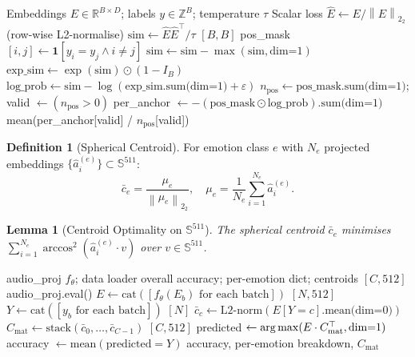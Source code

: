 \documentclass[12pt,a4paper]{article}
\theoremstyle{definition}
\newtheorem{definition}{Definition}[section]
\theoremstyle{plain}
\newtheorem{lemma}[theorem]{Lemma}
\theoremstyle{remark}
\newcommand{\R}{\mathbb{R}}
\newcommand{\Sph}{\mathbb{S}}
\newcommand{\Norm}[1]{\left\|#1\right\|_2}
\newcommand{\argmax}{\operatornamewithlimits{arg\,max}}
\begin{document}
\begin{algorithm}[H]
\caption{SupCon Loss Computation}
\label{alg:supcon}
\begin{algorithmic}[1]
\Require Embeddings $E \in \R^{B \times D}$; labels $y \in \mathbb{Z}^B$; temperature $\tau$
\Ensure Scalar loss
\State $\hat{E} \gets E / \Norm{E}_2$ (row-wise L2-normalise)
\State $\text{sim} \gets \hat{E}\hat{E}^\top / \tau$ \quad $[B,B]$
\State pos\_mask$[i,j] \gets \mathbf{1}[y_i = y_j \wedge i \ne j]$
\State $\text{sim} \gets \text{sim} - \max(\text{sim}, \text{dim=1})$ 
\State $\text{exp\_sim} \gets \exp(\text{sim}) \odot (1 - I_B)$ 
\State $\text{log\_prob} \gets \text{sim} - \log(\text{exp\_sim.sum(dim=1)} + \varepsilon)$
\State $n_{\text{pos}} \gets \text{pos\_mask.sum(dim=1)}$; valid $\gets (n_{\text{pos}} > 0)$
  \EndIf
\State per\_anchor $\gets -(\text{pos\_mask} \odot \text{log\_prob}).\text{sum(dim=1)}$
\State \Return mean(per\_anchor[valid] / $n_{\text{pos}}$[valid])
\end{algorithmic}
\end{algorithm}

\begin{definition}[Spherical Centroid]
For emotion class $e$ with $N_e$ projected embeddings $\{\hat{a}_i^{(e)}\} \subset \Sph^{511}$:
\[
  \bar{c}_e = \frac{\mu_e}{\Norm{\mu_e}_2}, \quad \mu_e = \frac{1}{N_e}\sum_{i=1}^{N_e}\hat{a}_i^{(e)}.
\]
\end{definition}

\begin{lemma}[Centroid Optimality on $\Sph^{511}$]
The spherical centroid $\bar{c}_e$ minimises $\sum_{i=1}^{N_e} \arccos^2(\hat{a}_i^{(e)} \cdot v)$ over $v \in \Sph^{511}$.
\end{lemma}

\begin{algorithm}[H]
\caption{Emotion Accuracy Evaluation via Centroid Nearest-Neighbour}
\label{alg:centroid_eval}
\begin{algorithmic}[1]
\Require audio\_proj $f_\theta$; data loader
\Ensure overall accuracy; per-emotion dict; centroids $[C, 512]$
\State audio\_proj.eval()
\State $E \gets \text{cat}([f_\theta(E_b) \text{ for each batch}])$ \quad $[N, 512]$
\State $Y \gets \text{cat}([y_b \text{ for each batch}])$ \quad $[N]$
  \State $\bar{c}_c \gets \text{L2-norm}(E[Y{=}c].\text{mean(dim=0)})$
\EndFor
\State $C_{\text{mat}} \gets \text{stack}(\bar{c}_0,\ldots,\bar{c}_{C-1})$ \quad $[C, 512]$
\State predicted $\gets \argmax(E \cdot C_{\text{mat}}^\top, \text{dim=1})$
\State accuracy $\gets \text{mean}(\text{predicted} = Y)$
\State \Return accuracy, per-emotion breakdown, $C_{\text{mat}}$
\end{algorithmic}
\end{algorithm}
\end{document}
